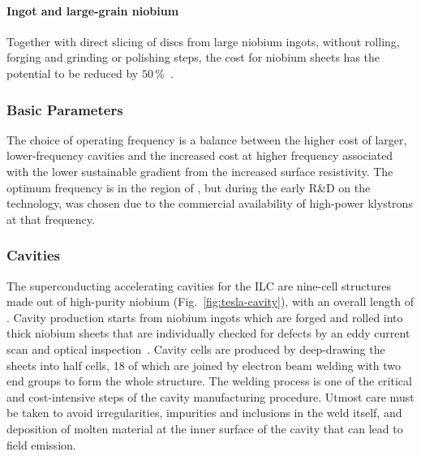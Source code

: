 \paragraph{Ingot and large-grain niobium}

Together with direct slicing of discs from large niobium ingots, without rolling, forging and grinding or polishing steps, the cost for niobium sheets has the potential to be reduced by $50\,\%$~\cite{Evans:2017rvt,Kneisel:2014uqa}.



\subsubsection{Basic Parameters}

The choice of operating frequency is a balance between the higher cost of larger, lower-frequency cavities and the increased cost at higher frequency associated with the lower sustainable gradient from the increased surface resistivity. 
The optimum frequency is in the region of , but during the early R\&D on the technology,  was chosen due to the commercial availability of high-power klystrons at that frequency.

\subsubsection{Cavities}

The superconducting accelerating cavities for the ILC are nine-cell structures made out of high-purity niobium (Fig.~\ref{fig:tesla-cavity}), with an overall length of .
Cavity production starts from niobium ingots which are forged and rolled into  thick niobium sheets that are individually checked for defects by an eddy current scan and optical inspection~\cite{Adolphsen:2013jya}.
Cavity cells are produced by deep-drawing the sheets into half cells, \num{18} of which are joined by electron beam welding with two end groups to form the whole structure.
The welding process is one of the critical and cost-intensive steps of the cavity manufacturing procedure. 
Utmost care must be taken to avoid irregularities, impurities and inclusions in the weld itself, and deposition of molten material at the inner surface of the cavity that can lead to field emission.

